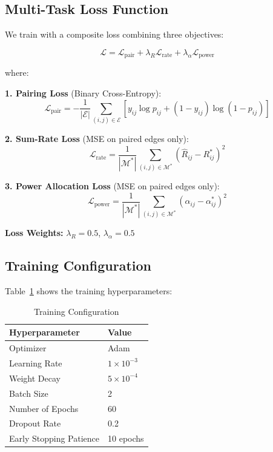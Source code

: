 \subsection{Multi-Task Loss Function}

We train with a composite loss combining three objectives:

\begin{equation}
\mathcal{L} = \mathcal{L}_{\text{pair}} + \lambda_R \mathcal{L}_{\text{rate}} + \lambda_\alpha \mathcal{L}_{\text{power}}
\end{equation}

where:

\textbf{1. Pairing Loss} (Binary Cross-Entropy):
\begin{equation}
\mathcal{L}_{\text{pair}} = -\frac{1}{|\mathcal{E}|} \sum_{(i,j) \in \mathcal{E}} \left[ y_{ij} \log p_{ij} + (1-y_{ij}) \log(1-p_{ij}) \right]
\end{equation}

\textbf{2. Sum-Rate Loss} (MSE on paired edges only):
\begin{equation}
\mathcal{L}_{\text{rate}} = \frac{1}{|\mathcal{M}^*|} \sum_{(i,j) \in \mathcal{M}^*} (\hat{R}_{ij} - R_{ij}^*)^2
\end{equation}

\textbf{3. Power Allocation Loss} (MSE on paired edges only):
\begin{equation}
\mathcal{L}_{\text{power}} = \frac{1}{|\mathcal{M}^*|} \sum_{(i,j) \in \mathcal{M}^*} (\alpha_{ij} - \alpha_{ij}^*)^2
\end{equation}

\textbf{Loss Weights:} $\lambda_R = 0.5$, $\lambda_\alpha = 0.5$

\subsection{Training Configuration}

Table~\ref{tab:training_config} shows the training hyperparameters:

\begin{table}[ht]
\centering
\caption{Training Configuration}
\label{tab:training_config}
\begin{tabular}{|l|l|}
\hline
\textbf{Hyperparameter} & \textbf{Value} \\
\hline
Optimizer & Adam \\
Learning Rate & $1 \times 10^{-3}$ \\
Weight Decay & $5 \times 10^{-4}$ \\
Batch Size & 2 \\
Number of Epochs & 60 \\
Dropout Rate & 0.2 \\
Early Stopping Patience & 10 epochs \\
\hline
\end{tabular}
\end{table}

